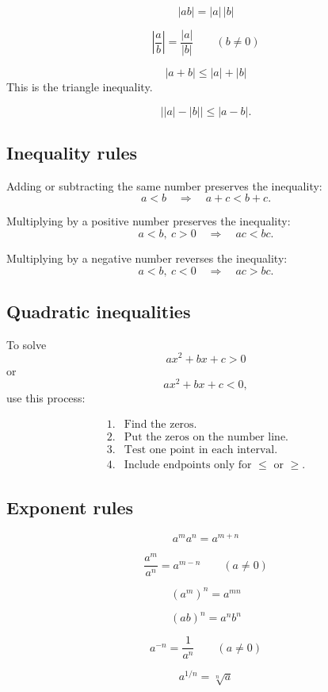 \[
\boxed{
    |ab|=|a|\,|b|
}
\]

\[
\boxed{
    \left|\frac ab\right|=\frac{|a|}{|b|}
    \qquad (b\ne0)
}
\]

\[
\boxed{
    |a+b|\le |a|+|b|
}
\]
This is the triangle inequality.

\[
\boxed{
    \bigl||a|-|b|\bigr|\le |a-b|.
}
\]

\subsection*{Inequality rules}

Adding or subtracting the same number preserves the inequality:
\[
    a<b
    \quad\Longrightarrow\quad
    a+c<b+c.
\]

Multiplying by a positive number preserves the inequality:
\[
    a<b,\ c>0
    \quad\Longrightarrow\quad
    ac<bc.
\]

Multiplying by a negative number reverses the inequality:
\[
    a<b,\ c<0
    \quad\Longrightarrow\quad
    ac>bc.
\]

\subsection*{Quadratic inequalities}

To solve
\[
    ax^2+bx+c>0
\]
or
\[
    ax^2+bx+c<0,
\]
use this process:

\[
\begin{array}{ll}
1. & \text{Find the zeros.}\\
2. & \text{Put the zeros on the number line.}\\
3. & \text{Test one point in each interval.}\\
4. & \text{Include endpoints only for }\le\text{ or }\ge.
\end{array}
\]

\subsection*{Exponent rules}

\[
\boxed{
    a^m a^n=a^{m+n}
}
\]

\[
\boxed{
    \frac{a^m}{a^n}=a^{m-n}
    \qquad (a\ne0)
}
\]

\[
\boxed{
    (a^m)^n=a^{mn}
}
\]

\[
\boxed{
    (ab)^n=a^n b^n
}
\]

\[
\boxed{
    a^{-n}=\frac1{a^n}
    \qquad (a\ne0)
}
\]

\[
\boxed{
    a^{1/n}=\sqrt[n]{a}
}
\]

